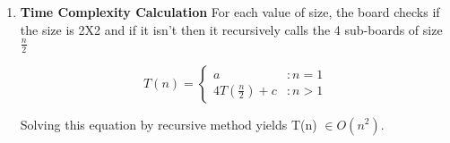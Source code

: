 \documentclass[a4paper,11pt]{article}
\begin{document}
\begin{enumerate}
\item \textbf{Time Complexity Calculation}
For each value of size, the board checks if the size is 2X2 and if it isn't then it recursively calls the 4 sub-boards of size $\frac{n}{2}$

\begin{displaymath}   T(n) = \left\{
     \begin{array}{lr}
       a & : n = 1\\
       4T(\frac{n}{2}) + c & : n > 1
     \end{array}
   \right.
\end{displaymath}

Solving this equation by recursive method yields T(n) $\in O(n^2)$.
 
\end{enumerate}
\end{document}
